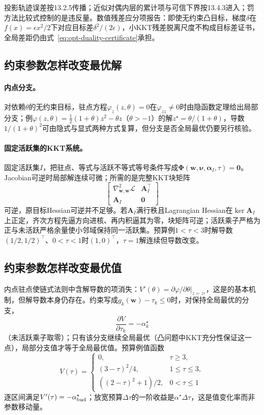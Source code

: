 投影轨迹误差按13.2.5传播；近似对偶内层的累计项与可信下界按13.4.3进入；罚方法比较式控制的是违反量。数值残差应分项报告：即使无约束凸目标，梯度$\delta$在$f(x)=\epsilon x^2/2$下对应目标差$\delta^2/(2\epsilon)$，小KKT残差脱离尺度不构成目标差证书，全局差距仍由式~\eqref{eq:opt-duality-certificate}承担。

\subsection{约束参数怎样改变最优解}

\paragraph{内点分支。}
对依赖$\theta$的无约束目标，驻点方程$\varphi_z(z,\theta)=0$在$\varphi_{zz}\neq0$时由隐函数定理给出局部分支；例$\varphi(z,\theta)=\frac12(1+\theta)z^2-\theta z$（$\theta>-1$）的解$z^\star=\theta/(1+\theta)$，导数$1/(1+\theta)^2$可由隐式与显式两种方式复算，但分支是否全局最优仍要另行核验。

\paragraph{固定活跃集的KKT系统。}
固定活跃集$I$，把驻点、等式与活跃不等式等号条件写成$\bm\Phi(\bm w,\bm\nu,\bm\alpha_I,\tau)=\bm0$。Jacobian可逆时局部解连续可微；所需的是完整KKT块矩阵
\[
 \begin{bmatrix}
 \nabla_{\bm w,\bm w}^2\mathcal L&\bm A_I^\top\\
 \bm A_I&\bm0
 \end{bmatrix}
\]
可逆，原目标Hessian可逆并不足够。若$\bm A_I$满行秩且Lagrangian Hessian在$\ker\bm A_I$上正定，齐次方程先逼方向进核、再内积逼其为零，块矩阵可逆；活跃乘子严格为正与未活跃严格余量使小邻域保持同一活跃集。预算例$1<\tau<3$时解导数$(1/2,1/2)^\top$、$0<\tau<1$时$(1,0)^\top$，$\tau=1$解连续但导数改变。

\subsection{约束参数怎样改变最优值}

内点驻点使链式法则中含解导数的项消失：$V'(\theta)=\partial\varphi/\partial\theta|_{z=z^\star}$，这是的基本机制，但解导数本身仍存在。约束写成$g_k(\bm w)-\tau_k\leq0$时，对保持全局最优的分支，
\[
 \frac{\partial V}{\partial\tau_k}=-\alpha_k^\star
\]
（未活跃乘子取零）；只有该分支继续全局最优（凸问题中KKT充分性保证这一点），局部分支值才等于全局最优值。预算例值函数
\[
 V(\tau)=
 \begin{cases}
 0,&\tau\geq3,\\
 (3-\tau)^2/4,&1\leq\tau\leq3,\\
 ((2-\tau)^2+1)/2,&0<\tau\leq1
 \end{cases}
\]
逐区间满足$V'(\tau)=-\alpha_{\rm bud}^\star$；放宽预算$\Delta\tau$的一阶收益是$\alpha^\star\Delta\tau$，这是值变化率而非参数移动量。

